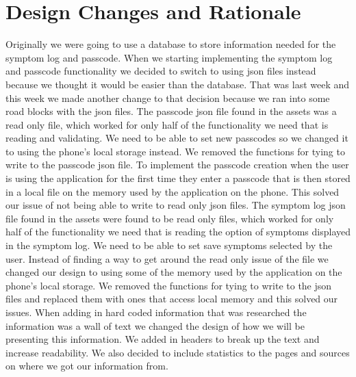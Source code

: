 \documentclass[letterpaper,12pt,titlepage]{article}
\begin{document}
\section{Design Changes and Rationale}
Originally we were going to use a database to store information needed for the symptom log and passcode. When we starting implementing the symptom log and passcode functionality we decided to switch to using json files instead because we thought it would be easier than the database. That was last week and this week we made another change to that decision because we ran into some road blocks with the json files. 
\newline
\newline
The passcode json file found in the assets was a read only file, which worked for only half of the functionality we need that is reading and validating. We need to be able to set new passcodes so we changed it to using the phone’s local storage instead. We removed the functions for tying to write to the passcode json file. To implement the passcode creation when the user is using the application for the first time they enter a passcode that is then stored in a local file on the memory used by the application on the phone. This solved our issue of not being able to write to read only json files.
\newline
\newline
The symptom log json file found in the assets were found to be read only files, which worked for only half of the functionality we need that is reading the option of symptoms displayed in the symptom log. We need to be able to set save symptoms selected by the user. Instead of finding a way to get around the read only issue of the file we changed our design to using some of the memory used by the application on the phone’s local storage. We removed the functions for tying to write to the json files and replaced them with ones that access local memory and this solved our issues.
\newline
\newline
When adding in hard coded information that was researched the information was a wall of text we changed the design of how we will be presenting this information. We added in headers to break up the text and increase readability. We also decided to include statistics to the pages and sources on where we got our information from.

\newpage
\end{document}
